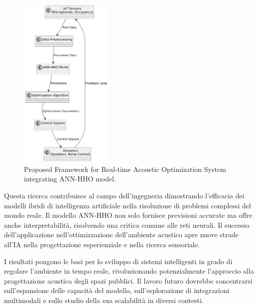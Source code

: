 \begin{figure}[H]
      \centering
      \includegraphics[width=0.4\textwidth]{Chapters/Figures/real_time_system.png}
      \caption{\small Proposed Framework for Real-time Acoustic Optimization System integrating ANN-HHO model.}
      \label{fig:realtimesystem}
\end{figure}

Questa ricerca contribuisce al campo dell'ingegneria dimostrando l'efficacia dei modelli ibridi di intelligenza artificiale nella risoluzione di problemi complessi del mondo reale. Il modello ANN-HHO non solo fornisce previsioni accurate ma offre anche interpretabilità, risolvendo una critica comune alle reti neurali. Il successo dell'applicazione nell'ottimizzazione dell'ambiente acustico apre nuove strade all'IA nella progettazione esperienziale e nella ricerca sensoriale.

I risultati pongono le basi per lo sviluppo di sistemi intelligenti in grado di regolare l'ambiente in tempo reale, rivoluzionando potenzialmente l'approccio alla progettazione acustica degli spazi pubblici. Il lavoro futuro dovrebbe concentrarsi sull'espansione delle capacità del modello, sull'esplorazione di integrazioni multimodali e sullo studio della sua scalabilità in diversi contesti.
